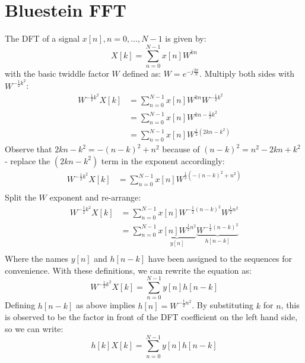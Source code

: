 \section{Bluestein FFT}

The DFT of a signal $x[n], n=0, \ldots, N-1$ is given by:
\begin{equation}
 X[k] = \sum_{n=0}^{N-1} x[n] W^{kn}
\end{equation}
with the basic twiddle factor $W$ defined as: $W = e^{-j \frac{2 \pi}{N} }$. Multiply both sides with $W^{-\frac{1}{2}k^2}$:
\begin{equation}
 \begin{aligned}
 W^{-\frac{1}{2}k^2} X[k] 
 &= \sum_{n=0}^{N-1} x[n] W^{kn} W^{-\frac{1}{2}k^2} \\
 &= \sum_{n=0}^{N-1} x[n] W^{kn - \frac{1}{2}k^2}  \\
 &= \sum_{n=0}^{N-1} x[n] W^{\frac{1}{2} (2kn - k^2)}  
 \end{aligned}
\end{equation}
Observe that $2kn - k^2 = -(n-k)^2 + n^2$ because of $(n-k)^2 = n^2 - 2kn + k^2$ - replace the $(2kn - k^2)$ term in the exponent accordingly:
\begin{equation}
 \begin{aligned}
 W^{-\frac{1}{2}k^2} X[k] 
 &= \sum_{n=0}^{N-1} x[n] W^{\frac{1}{2} (-(n-k)^2 + n^2)}  \\ 
 \end{aligned}
\end{equation}
Split the $W$ exponent and re-arrange:
\begin{equation}
 \begin{aligned}
 W^{-\frac{1}{2}k^2} X[k] 
 &= \sum_{n=0}^{N-1} x[n] W^{-\frac{1}{2} (n-k)^2} W^{\frac{1}{2}n^2}  \\ 
 &= \sum_{n=0}^{N-1} \underbrace{ x[n] W^{\frac{1}{2}n^2} }_{y[n]}  
                     \underbrace{ W^{-\frac{1}{2} (n-k)^2} }_{h[n-k]}   \\ 
 \end{aligned}
\end{equation}
Where the names $y[n]$ and $h[n-k]$ have been assigned to the sequences for convenience. With these definitions, we can rewrite the equation as:
\begin{equation}
 W^{-\frac{1}{2}k^2} X[k] = \sum_{n=0}^{N-1} y[n] h[n-k]
\end{equation}
Defining $h[n-k]$ as above implies $h[n] = W^{-\frac{1}{2} n^2}$. By substituting $k$ for $n$, this is observed to be the factor in front of the DFT coefficient on the left hand side, so we can write:
\begin{equation}
\label{eqn:ModulatedDFT}
 h[k] X[k] = \sum_{n=0}^{N-1} y[n] h[n-k]
\end{equation}

